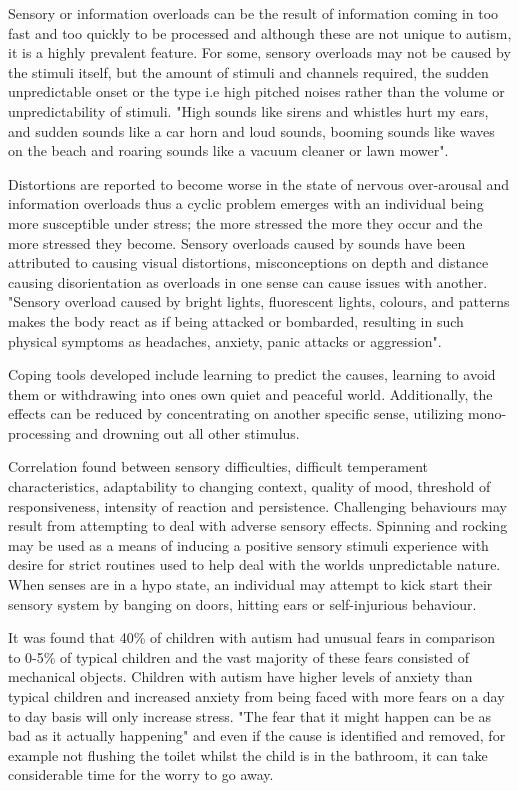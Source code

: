 \documentclass[11pt]{report}
\begin{document}
Sensory or information overloads can be the result of information coming in too fast and too quickly to be processed and although these are not unique to autism, it is a highly prevalent feature. For some, sensory overloads may not be caused by the stimuli itself, but the amount of stimuli and channels required, the sudden unpredictable onset or the type i.e high pitched noises rather than the volume or unpredictability of stimuli. "High sounds like sirens and whistles hurt my ears, and sudden sounds like a car horn and loud sounds, booming sounds like waves on the beach and roaring sounds like a vacuum cleaner or lawn mower". 

Distortions are reported to become worse in the state of nervous over-arousal and information overloads\cite{olgab} thus a cyclic problem emerges with an individual being more susceptible under stress; the more stressed the more they occur and the more stressed they become. Sensory overloads caused by sounds have been attributed to causing visual distortions, misconceptions on depth and distance causing disorientation\cite{sensoryexperiences} as overloads in one sense can cause issues with another. "Sensory overload caused by bright lights, fluorescent lights, colours, and patterns makes the body react as if being attacked or bombarded, resulting in such physical symptoms as headaches, anxiety, panic attacks or aggression"\cite{bayes}. 

Coping tools developed include learning to predict the causes, learning to avoid them or withdrawing into ones own quiet and peaceful world. Additionally, the effects can be reduced by concentrating on another specific sense, utilizing mono-processing and drowning out all other stimulus. 

Correlation found between sensory difficulties, difficult temperament characteristics, adaptability to changing context, quality of mood, threshold of responsiveness, intensity of reaction and persistence\cite{temperament}. Challenging behaviours may result from attempting to deal with adverse sensory effects. Spinning and rocking may be used as a means of inducing a positive sensory stimuli experience with desire for strict routines used to help deal with the worlds unpredictable nature\cite{sensory_overview}. When senses are in a hypo state, an individual may attempt to kick start their sensory system by banging on doors, hitting ears or self-injurious behaviour\cite{sensory_overview}. 

It was found that 40\% of children with autism had unusual fears in comparison to 0-5\% of typical children and the vast majority of these fears consisted of mechanical objects. Children with autism have higher levels of anxiety than typical children\cite{fears} and increased anxiety from being faced with more fears on a day to day basis will only increase stress. "The fear that it might happen can be as bad as it actually happening"\cite{fears} and even if the cause is identified and removed, for example not flushing the toilet whilst the child is in the bathroom, it can take considerable time for the worry to go away.
\end{document}
